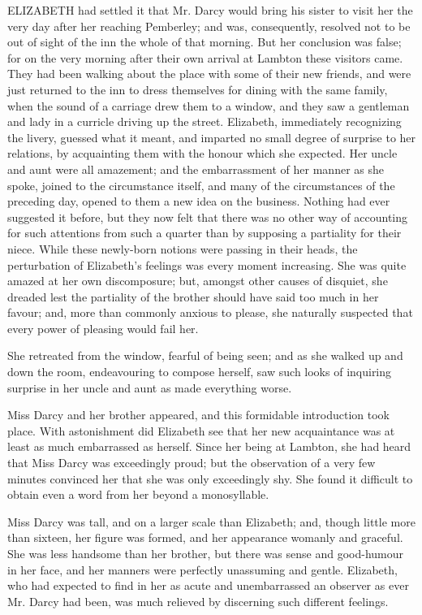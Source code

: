 \documentclass[12pt,openright]{book}
\begin{document}
\noindent  ELIZABETH had settled it that Mr. Darcy would bring his sister to visit her the very day after her reaching Pemberley; and was, consequently, resolved not to be out of sight of the inn the whole of that morning. But her conclusion was false; for on the very morning after their own arrival at Lambton these visitors came. They had been walking about the place with some of their new friends, and were just returned to the inn to dress themselves for dining with the same family, when the sound of a carriage drew them to a window, and they saw a gentleman and lady in a curricle driving up the street. Elizabeth, immediately recognizing the livery, guessed what it meant, and imparted no small degree of surprise to her relations, by acquainting them with the honour which she expected. Her uncle and aunt were all amazement; and the embarrassment of her manner as she spoke, joined to the circumstance itself, and many of the circumstances of the preceding day, opened to them a new idea on the business. Nothing had ever suggested it before, but they now felt that there was no other way of accounting for such attentions from such a quarter than by supposing a partiality for their niece. While these newly-born notions were passing in their heads, the perturbation of Elizabeth’s feelings was every moment increasing. She was quite amazed at her own discomposure; but, amongst other causes of disquiet, she dreaded lest the partiality of the brother should have said too much in her favour; and, more than commonly anxious to please, she naturally suspected that every power of pleasing would fail her.

She retreated from the window, fearful of being seen; and as she walked up and down the room, endeavouring to compose herself, saw such looks of inquiring surprise in her uncle and aunt as made everything worse.

Miss Darcy and her brother appeared, and this formidable introduction took place. With astonishment did Elizabeth see that her new acquaintance was at least as much embarrassed as herself. Since her being at Lambton, she had heard that Miss Darcy was exceedingly proud; but the observation of a very few minutes convinced her that she was only exceedingly shy. She found it difficult to obtain even a word from her beyond a monosyllable.

Miss Darcy was tall, and on a larger scale than Elizabeth; and, though little more than sixteen, her figure was formed, and her appearance womanly and graceful. She was less handsome than her brother, but there was sense and good-humour in her face, and her manners were perfectly unassuming and gentle. Elizabeth, who had expected to find in her as acute and unembarrassed an observer as ever Mr. Darcy had been, was much relieved by discerning such different feelings.
\end{document}
